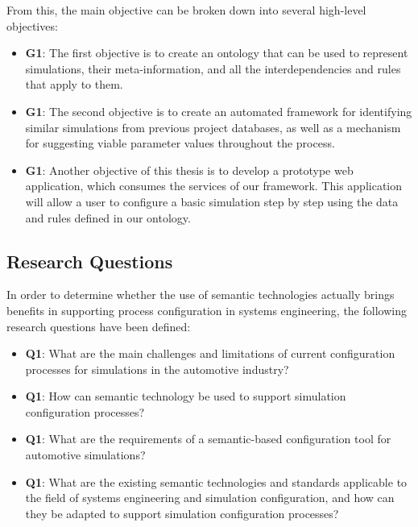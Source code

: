 From this, the main objective can be broken down into several high-level objectives:

\begin{itemize}
  \item \textbf{G1\label{G1}}: The first objective is to create an ontology that can be used to represent simulations, their meta-information, and all the interdependencies and rules that apply to them.

    \item \textbf{G1\label{G2}}: The second objective is to create an automated framework for identifying similar simulations from previous project databases, as well as a mechanism for suggesting viable parameter values throughout the process.
    
    \item \textbf{G1\label{G3}}: Another objective of this thesis is to develop a prototype web application, which consumes the services of our framework. This application will allow a user to configure a basic simulation step by step using the data and rules defined in our ontology.

\end{itemize}


\subsection{Research Questions}

In order to determine whether the use of semantic technologies actually brings benefits in supporting process configuration in systems engineering, the following research questions have been defined: 

\begin{itemize}
  \item \textbf{Q1\label{Q1}}: What are the main challenges and limitations of current configuration processes for simulations in the automotive industry?
    \item \textbf{Q1\label{Q2}}: How can semantic technology be used to support simulation configuration processes?
    \item \textbf{Q1\label{Q3}}: What are the requirements of a semantic-based configuration tool for automotive simulations?
    \item \textbf{Q1\label{Q4}}: What are the existing semantic technologies and standards applicable to the field of systems engineering and simulation configuration, and how can they be adapted to support simulation configuration processes?
 \end{itemize}


